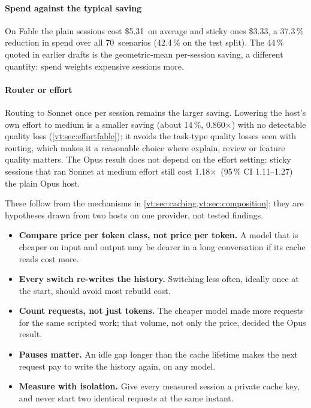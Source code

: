 \documentclass[11pt,letterpaper]{article}
\newcommand{\X}{\ensuremath{\times}}
\newcommand{\CfFableStickySaving}{44}
\newcommand{\EfCutPct}{14}
\newcommand{\EfRatio}{0.860}
\newcommand{\NScenarios}{70}
\newcommand{\RvEffVsAnchorOpusCI}{1.11--1.27}
\newcommand{\RvEffVsAnchorOpusTwo}{1.18}
\newcommand{\RvSpendAnchor}{5.31}
\newcommand{\RvSpendCutAll}{37.3}
\newcommand{\RvSpendCutTest}{42.4}
\newcommand{\RvSpendSticky}{3.33}
\begin{document}
\paragraph{Spend against the typical saving} On Fable the plain sessions cost \$\RvSpendAnchor\ on average and sticky
ones \$\RvSpendSticky, a \RvSpendCutAll\,\% reduction in spend over all \NScenarios\ scenarios (\RvSpendCutTest\,\% on the
test split). The \CfFableStickySaving\,\% quoted in earlier drafts is the geometric-mean per-session saving, a different
quantity: spend weights expensive sessions more.

\paragraph{Router or effort} Routing to Sonnet once per session remains the larger saving. Lowering the host's own
effort to medium is a smaller saving (about \EfCutPct\,\%, \EfRatio\X) with no detectable quality loss
(\cref{vt:sec:effortfable}); it avoids the task-type quality losses seen with routing, which makes it a reasonable choice
where explain, review or feature quality matters. The Opus result does not depend on the effort setting: sticky sessions
that ran Sonnet at medium effort still cost \RvEffVsAnchorOpusTwo\X\ (95\,\% CI \RvEffVsAnchorOpusCI) the plain Opus host.

\begin{keyidea}[title={Caching guidance (hypotheses)}]
These follow from the mechanisms in \cref{vt:sec:caching,vt:sec:composition}; they are hypotheses drawn from two hosts on
one provider, not tested findings.
\begin{itemize}[leftmargin=1.1em]
  \item \textbf{Compare price per token class, not price per token.} A model that is cheaper on input and output may be
    dearer in a long conversation if its cache reads cost more.
  \item \textbf{Every switch re-writes the history.} Switching less often, ideally once at the start, should avoid most
    rebuild cost.
  \item \textbf{Count requests, not just tokens.} The cheaper model made more requests for the same scripted work; that
    volume, not only the price, decided the Opus result.
  \item \textbf{Pauses matter.} An idle gap longer than the cache lifetime makes the next request pay to write the
    history again, on any model.
  \item \textbf{Measure with isolation.} Give every measured session a private cache key, and never start two identical
    requests at the same instant.
\end{itemize}
\end{keyidea}
\end{document}
